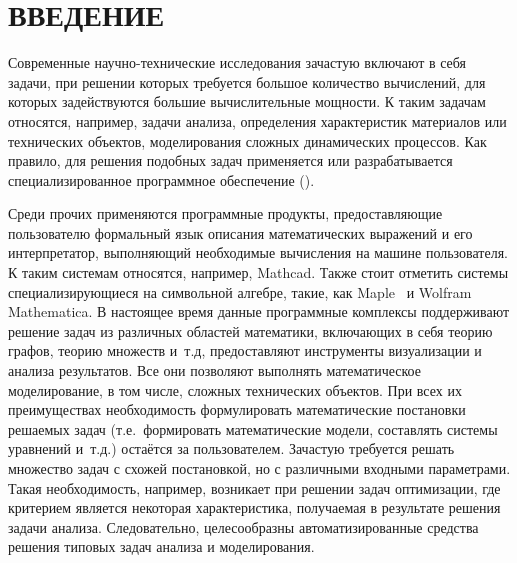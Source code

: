 \chapter*{ВВЕДЕНИЕ}\label{chap.introduction}
Современные научно-технические исследования зачастую включают в себя задачи, при решении которых требуется большое количество вычислений, для которых задействуются большие вычислительные мощности. К таким задачам относятся, например, задачи анализа, определения характеристик материалов или технических объектов, моделирования сложных динамических процессов. Как правило, для решения подобных задач применяется или разрабатывается специализированное программное обеспечение ().

Среди прочих применяются программные продукты, предоставляющие пользователю формальный язык описания математических выражений и его интерпретатор, выполняющий необходимые вычисления на машине пользователя. К таким системам относятся, например, Mathcad. Также стоит отметить системы специализирующиеся на символьной алгебре, такие, как Maple~\cite{CharMaple1983} и Wolfram Mathematica. В настоящее время данные программные комплексы поддерживают решение задач из различных областей математики, включающих в себя теорию графов, теорию множеств и~т.д, предоставляют инструменты визуализации и анализа результатов. Все они позволяют выполнять математическое моделирование, в том числе, сложных технических объектов. При всех их преимуществах необходимость формулировать математические постановки решаемых задач (т.е.~формировать математические модели, составлять системы уравнений и~т.д.) остаётся за пользователем. Зачастую требуется решать множество задач с схожей постановкой, но с различными входными параметрами. Такая необходимость, например, возникает при решении задач оптимизации, где критерием является некоторая характеристика, получаемая в результате решения задачи анализа. Следовательно, целесообразны автоматизированные средства решения типовых задач анализа и моделирования.

